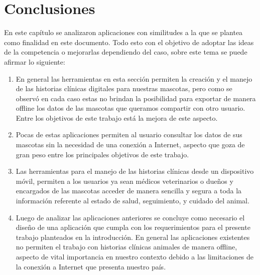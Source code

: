 \section{Conclusiones}\label{chapter:conclus}

En este capítulo se analizaron aplicaciones con similitudes a la que se plantea como finalidad en este documento. Todo esto con el objetivo de adoptar las ideas de la competencia o mejorarlas dependiendo del caso, sobre este tema se puede afirmar lo siguiente:
\begin{enumerate}
	\item	En general las herramientas en esta sección permiten la creación y el manejo de las historias clínicas digitales para nuestras mascotas, pero como se observó en cada caso estas no brindan la posibilidad para exportar de manera offline los datos de las mascotas que queramos compartir con otro usuario. Entre los objetivos de este trabajo está la mejora de este aspecto.
	\item	Pocas de estas aplicaciones permiten al usuario consultar los datos de sus mascotas sin la necesidad de una conexión a Internet, aspecto que goza de gran peso entre los principales objetivos de este trabajo.
	\item	Las herramientas para el manejo de las historias clínicas desde un dispositivo móvil, permiten a los usuarios ya sean médicos veterinarios o dueños y encargados de las mascotas acceder de manera sencilla y segura a toda la información referente al estado de salud, seguimiento, y cuidado del animal.
	\item	Luego de analizar las aplicaciones anteriores se concluye como necesario el diseño de una aplicación que cumpla con los requerimientos para el presente trabajo planteados en la introducción. En general las aplicaciones existentes no permiten el trabajo con historias clínicas animales de manera offline, aspecto de vital importancia en nuestro contexto debido a las limitaciones de la conexión a Internet que presenta nuestro país.
\end{enumerate}








